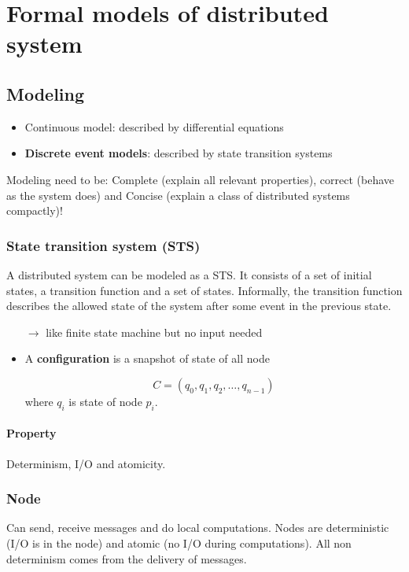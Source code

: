 \section{Formal models of distributed system}

\subsection{Modeling}

\begin{itemize}
    \item Continuous model: described by differential equations
    \item \textbf{Discrete event models}: described by state transition systems
\end{itemize}

Modeling need to be: Complete (explain all relevant properties),
correct (behave as the system does) and Concise (explain a class of distributed
systems compactly)!

\subsubsection{State transition system (STS)}

A distributed system can be modeled as a STS. It consists of a set of initial
states, a transition function and a set of states. Informally, the transition
function describes the allowed state of the system after some event in the previous
state.

\begin{enumerate}
    \item[$\to$] like finite state machine but no input needed
\end{enumerate}

\begin{itemize}
    \item A \textbf{configuration} is a snapshot of state of all node

        $$ C =(q_0, q_1, q_2,\ldots, q_{n-1}) $$  where $q_i$ is state of node $p_i$.
\end{itemize}

\paragraph{Property}
Determinism, I/O and atomicity.

\subsubsection{Node}
Can send, receive messages and do local computations. Nodes are deterministic
(I/O is in the node) and atomic (no I/O during computations). All non determinism
comes from the delivery of messages.


